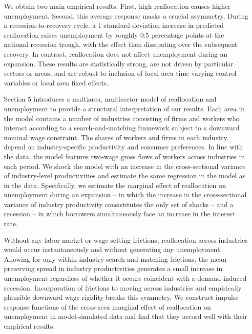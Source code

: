\documentclass[12pt]{article}
\newcommand{\highlightP}[1]{{\emph{\color{MyPink}{#1}}}}
\theoremstyle{definition}
\begin{document}
We obtain two main empirical results. First, high reallocation causes higher unemployment. Second, this average response masks a crucial asymmetry. During a recession-to-recovery cycle, a 1 standard deviation increase in predicted reallocation raises unemployment by roughly $0.5$ percentage points at the national recession trough, with the effect then dissipating over the subsequent recovery. In contrast, reallocation does not affect unemployment during an expansion. These results are statistically strong, are not driven by particular sectors or areas, and are robust to inclusion of local area time-varying control variables or local area fixed effects.

Section 5 introduces a multiarea, multisector model of reallocation and unemployment to provide a structural interpretation of our results. Each area in the model contains a number of industries consisting of firms and workers who interact according to a search-and-matching framework subject to a downward nominal wage constraint. The shares of workers and firms in each industry depend on industry-specific productivity and consumer preferences. In line with the data, the model features two-wage gross flows of workers across industries in each period. We shock the model with an increase in the cross-sectional variance of industry-level productivities and estimate the same regression in the model as in the data. Specifically, we estimate the marginal effect of reallocation on unemployment during an expansion -- in which the increase in the cross-sectional variance of industry productivity consistitutes the only set of shocks -- and a recession -- in which borrowers simultaneously face an increase in the interest rate. 

Without any labor market or wage-setting frictions, reallocation across industries would occur instantaneously and without generating any unemployment. Allowing for only within-industry search-and-matching frictions, the mean preserving spread in industry productivities generates a small increase in unemployment regardless of whether it occurs coincident with a demand-induced recession. Incorporation of frictions to moving across industries and empirically plausible downward wage rigidity breaks this symmetry. \highlightP{Intuitively, during expansions higher wages draw job seekers into the expanding sectors, while wage compression during recessions pushes the adjustment into a greater difference in job-finding rates.} We construct impulse response functions of the cross-area marginal effect of reallocation on unemployment in model-simulated data and find that they accord well with their empirical results. 
\end{document}
